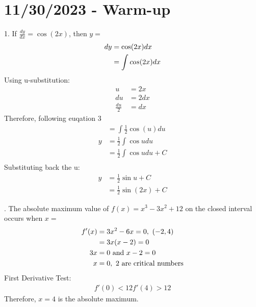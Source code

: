 \documentclass[11pt]{article}
\newcommand*{\vs}{\vspace{1cm}}
\newcommand*{\next}{\noindent}
\newcommand*{\set}{\setcounter{equation}{0}}
\begin{document}
\section{11/30/2023 - Warm-up}
1. If $\frac{dy}{dx}=\cos(2x)$, then $y=$
\begin{align}
    \set
    dy&=\cos(2x)dx\\
    &=\int cos(2x)dx\\
\end{align}
Using u-substitution:
\begin{align}
    u&=2x\\
    du&=2dx\\
    \frac{du}{2}&=dx
\end{align}
Therefore, following euqation 3
\begin{align}
    &=\int\frac{1}{2}\cos(u)du\\
    y&=\frac{1}{2}\int\cos udu\\
    &=\frac{1}{2}\int\cos udu+C\\
\end{align}
Substituting back the u:
\begin{align}
    y&=\frac{1}{2}\sin u+C\\
    &=\frac{1}{2}\sin(2x)+C
\end{align}

\vs\next
2. The absolute maximum value of $f(x)=x^3-3x^2+12$ on the closed interval occurs when $x=$
\begin{align}
    \set
    f'(x)&=3x^2-6x=0,\,\, (-2, 4)\\
    &=3x(x-2)=0\\
    3x&=0\,\,\text{and}\,\, x-2=0\\
    x&=0,\,\,2\,\, \text{are critical numbers}
\end{align}
First Derivative Test:
\begin{align}
    f'(0)<12
    f'(4)>12
\end{align}
Therefore, $x=4$ is the absolute maximum.
\end{document}
